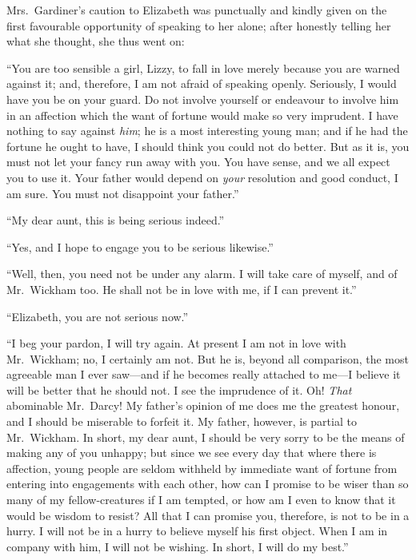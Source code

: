 \documentclass[12pt,english]{book}
\begin{document}


Mrs.\ Gardiner's caution to Elizabeth was punctually and kindly given
on the first favourable opportunity of speaking to her alone; after
honestly telling her what she thought, she thus went on:

{}``You are too sensible a girl, Lizzy, to fall in love merely because
you are warned against it; and, therefore, I am not afraid of speaking
openly. Seriously, I would have you be on your guard. Do not involve
yourself or endeavour to involve him in an affection which the want
of fortune would make so very imprudent. I have nothing to say against
\textit{him}; he is a most interesting young man; and if he had the
fortune he ought to have, I should think you could not do better.
But as it is, you must not let your fancy run away with you. You have
sense, and we all expect you to use it. Your father would depend on
\textit{your} resolution and good conduct, I am sure. You must not
disappoint your father.''

{}``My dear aunt, this is being serious indeed.''

{}``Yes, and I hope to engage you to be serious likewise.''

{}``Well, then, you need not be under any alarm. I will take care
of myself, and of Mr.\ Wickham too. He shall not be in love with
me, if I can prevent it.''

{}``Elizabeth, you are not serious now.''

{}``I beg your pardon, I will try again. At present I am not in love
with Mr.\ Wickham; no, I certainly am not. But he is, beyond all
comparison, the most agreeable man I ever saw\mbox{---}and if he
becomes really attached to me\mbox{---}I believe it will be better
that he should not. I see the imprudence of it. Oh! \textit{That}
abominable Mr.\ Darcy! My father's opinion of me does me the greatest
honour, and I should be miserable to forfeit it. My father, however,
is partial to Mr.\ Wickham. In short, my dear aunt, I should be very
sorry to be the means of making any of you unhappy; but since we see
every day that where there is affection, young people are seldom withheld
by immediate want of fortune from entering into engagements with each
other, how can I promise to be wiser than so many of my fellow-creatures
if I am tempted, or how am I even to know that it would be wisdom
to resist? All that I can promise you, therefore, is not to be in
a hurry. I will not be in a hurry to believe myself his first object.
When I am in company with him, I will not be wishing. In short, I
will do my best.''
\end{document}
